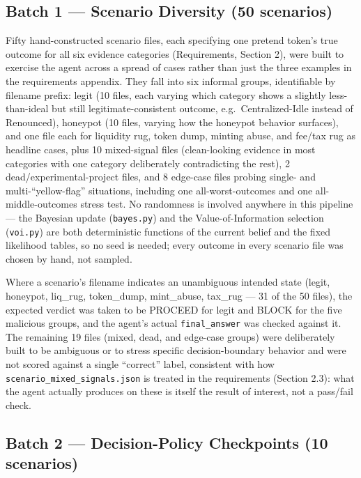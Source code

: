 \documentclass[11pt]{article}
\begin{document}
\subsection{Batch 1 --- Scenario Diversity (50 scenarios)}

Fifty hand-constructed scenario files, each specifying one pretend token's true outcome for all six evidence categories (Requirements, Section 2), were built to exercise the agent across a spread of cases rather than just the three examples in the requirements appendix. They fall into six informal groups, identifiable by filename prefix: legit (10 files, each varying which category shows a slightly less-than-ideal but still legitimate-consistent outcome, e.g.\ Centralized-Idle instead of Renounced), honeypot (10 files, varying how the honeypot behavior surfaces), and one file each for liquidity rug, token dump, minting abuse, and fee/tax rug as headline cases, plus 10 mixed-signal files (clean-looking evidence in most categories with one category deliberately contradicting the rest), 2 dead/experimental-project files, and 8 edge-case files probing single- and multi-``yellow-flag'' situations, including one all-worst-outcomes and one all-middle-outcomes stress test. No randomness is involved anywhere in this pipeline --- the Bayesian update (\texttt{bayes.py}) and the Value-of-Information selection (\texttt{voi.py}) are both deterministic functions of the current belief and the fixed likelihood tables, so no seed is needed; every outcome in every scenario file was chosen by hand, not sampled.

Where a scenario's filename indicates an unambiguous intended state (legit, honeypot, liq\_rug, token\_dump, mint\_abuse, tax\_rug --- 31 of the 50 files), the expected verdict was taken to be PROCEED for legit and BLOCK for the five malicious groups, and the agent's actual \texttt{final\_answer} was checked against it. The remaining 19 files (mixed, dead, and edge-case groups) were deliberately built to be ambiguous or to stress specific decision-boundary behavior and were not scored against a single ``correct'' label, consistent with how \texttt{scenario\_mixed\_signals.json} is treated in the requirements (Section 2.3): what the agent actually produces on these is itself the result of interest, not a pass/fail check.

\subsection{Batch 2 --- Decision-Policy Checkpoints (10 scenarios)}
\end{document}

